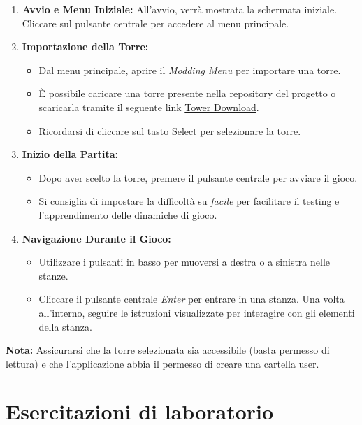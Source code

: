 \documentclass[a4paper,12pt]{report}
\begin{document}
\begin{enumerate}
    \item \textbf{Avvio e Menu Iniziale:}  
    All'avvio, verrà mostrata la schermata iniziale. Cliccare sul pulsante centrale per accedere al menu principale.

    \item \textbf{Importazione della Torre:}
    \begin{itemize}
        \item Dal menu principale, aprire il \textit{Modding Menu} per importare una torre.
        \item È possibile caricare una torre presente nella repository del progetto o scaricarla tramite il seguente link \href{https://google.com}{Tower Download}.
        \item Ricordarsi di cliccare sul tasto Select per selezionare la torre.
    \end{itemize}

    \item \textbf{Inizio della Partita:}
    \begin{itemize}
        \item Dopo aver scelto la torre, premere il pulsante centrale per avviare il gioco.
        \item Si consiglia di impostare la difficoltà su \textit{facile} per facilitare il testing e l'apprendimento delle dinamiche di gioco.
    \end{itemize}

    \item \textbf{Navigazione Durante il Gioco:}
    \begin{itemize}
        \item Utilizzare i pulsanti in basso per muoversi a destra o a sinistra nelle stanze.
        \item Cliccare il pulsante centrale \textit{Enter} per entrare in una stanza.  
              Una volta all'interno, seguire le istruzioni visualizzate per interagire con gli elementi della stanza.
    \end{itemize}
\end{enumerate}

\textbf{Nota:} Assicurarsi che la torre selezionata sia accessibile (basta permesso di lettura) e che l'applicazione abbia il permesso di creare una cartella user.
\chapter{Esercitazioni di laboratorio}
\end{document}
